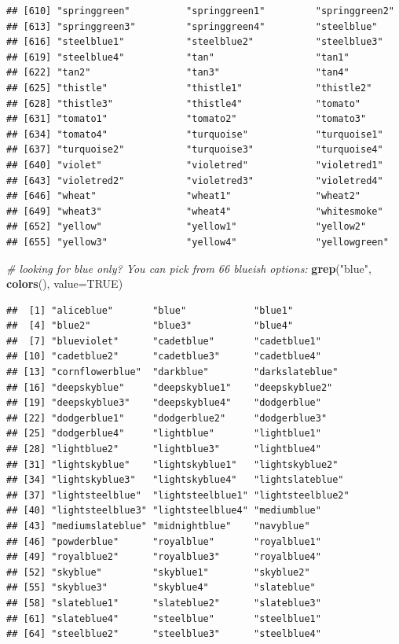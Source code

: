 \documentclass[]{book}
\newenvironment{Shaded}{\begin{snugshade}}{\end{snugshade}}
\newcommand{\CommentTok}[1]{\textcolor[rgb]{0.56,0.35,0.01}{\textit{#1}}}
\newcommand{\DataTypeTok}[1]{\textcolor[rgb]{0.13,0.29,0.53}{#1}}
\newcommand{\KeywordTok}[1]{\textcolor[rgb]{0.13,0.29,0.53}{\textbf{#1}}}
\newcommand{\NormalTok}[1]{#1}
\newcommand{\OtherTok}[1]{\textcolor[rgb]{0.56,0.35,0.01}{#1}}
\newcommand{\StringTok}[1]{\textcolor[rgb]{0.31,0.60,0.02}{#1}}
\begin{document}
\begin{verbatim}
## [610] "springgreen"          "springgreen1"         "springgreen2"        
## [613] "springgreen3"         "springgreen4"         "steelblue"           
## [616] "steelblue1"           "steelblue2"           "steelblue3"          
## [619] "steelblue4"           "tan"                  "tan1"                
## [622] "tan2"                 "tan3"                 "tan4"                
## [625] "thistle"              "thistle1"             "thistle2"            
## [628] "thistle3"             "thistle4"             "tomato"              
## [631] "tomato1"              "tomato2"              "tomato3"             
## [634] "tomato4"              "turquoise"            "turquoise1"          
## [637] "turquoise2"           "turquoise3"           "turquoise4"          
## [640] "violet"               "violetred"            "violetred1"          
## [643] "violetred2"           "violetred3"           "violetred4"          
## [646] "wheat"                "wheat1"               "wheat2"              
## [649] "wheat3"               "wheat4"               "whitesmoke"          
## [652] "yellow"               "yellow1"              "yellow2"             
## [655] "yellow3"              "yellow4"              "yellowgreen"
\end{verbatim}

\begin{Shaded}
\begin{Highlighting}[]
\CommentTok{# looking for blue only? You can pick from 66 blueish options:}
\KeywordTok{grep}\NormalTok{(}\StringTok{"blue"}\NormalTok{, }\KeywordTok{colors}\NormalTok{(), }\DataTypeTok{value=}\OtherTok{TRUE}\NormalTok{)}
\end{Highlighting}
\end{Shaded}

\begin{verbatim}
##  [1] "aliceblue"       "blue"            "blue1"          
##  [4] "blue2"           "blue3"           "blue4"          
##  [7] "blueviolet"      "cadetblue"       "cadetblue1"     
## [10] "cadetblue2"      "cadetblue3"      "cadetblue4"     
## [13] "cornflowerblue"  "darkblue"        "darkslateblue"  
## [16] "deepskyblue"     "deepskyblue1"    "deepskyblue2"   
## [19] "deepskyblue3"    "deepskyblue4"    "dodgerblue"     
## [22] "dodgerblue1"     "dodgerblue2"     "dodgerblue3"    
## [25] "dodgerblue4"     "lightblue"       "lightblue1"     
## [28] "lightblue2"      "lightblue3"      "lightblue4"     
## [31] "lightskyblue"    "lightskyblue1"   "lightskyblue2"  
## [34] "lightskyblue3"   "lightskyblue4"   "lightslateblue" 
## [37] "lightsteelblue"  "lightsteelblue1" "lightsteelblue2"
## [40] "lightsteelblue3" "lightsteelblue4" "mediumblue"     
## [43] "mediumslateblue" "midnightblue"    "navyblue"       
## [46] "powderblue"      "royalblue"       "royalblue1"     
## [49] "royalblue2"      "royalblue3"      "royalblue4"     
## [52] "skyblue"         "skyblue1"        "skyblue2"       
## [55] "skyblue3"        "skyblue4"        "slateblue"      
## [58] "slateblue1"      "slateblue2"      "slateblue3"     
## [61] "slateblue4"      "steelblue"       "steelblue1"     
## [64] "steelblue2"      "steelblue3"      "steelblue4"
\end{verbatim}
\end{document}
